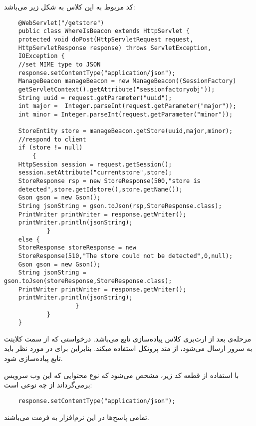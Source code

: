 \documentclass[oneside]{report}
\begin{document}
کد مربوط به این کلاس به شکل زیر می‌باشد: 
\begin{latin}
	\begin{verbatim}
	@WebServlet("/getstore")
	public class WhereIsBeacon extends HttpServlet {
	protected void doPost(HttpServletRequest request, 
	HttpServletResponse response) throws ServletException, 
	IOException {
	//set MIME type to JSON
	response.setContentType("application/json");
	ManageBeacon manageBeacon = new ManageBeacon((SessionFactory) 
	getServletContext().getAttribute("sessionfactoryobj"));
	String uuid = request.getParameter("uuid");
	int major =  Integer.parseInt(request.getParameter("major"));
	int minor = Integer.parseInt(request.getParameter("minor"));
	
	StoreEntity store = manageBeacon.getStore(uuid,major,minor);
	//respond to client
	if (store != null)
		{
	HttpSession session = request.getSession();
	session.setAttribute("currentstore",store);
	StoreResponse rsp = new StoreResponse(500,"store is 
	detected",store.getIdstore(),store.getName());
	Gson gson = new Gson();
	String jsonString = gson.toJson(rsp,StoreResponse.class);
	PrintWriter printWriter = response.getWriter();
	printWriter.println(jsonString);
	      	}
	else {
	StoreResponse storeResponse = new 
	StoreResponse(510,"The store could not be detected",0,null);
	Gson gson = new Gson();
	String jsonString = gson.toJson(storeResponse,StoreResponse.class);
	PrintWriter printWriter = response.getWriter();
	printWriter.println(jsonString);
	               	}
	        }
	}
	\end{verbatim}
\end{latin}
		
\noindent		
مرحله‌ی بعد از ارث‌بری کلاس
{\normalsize{}}
پیاده‌سازی تابع
{\normalsize{}}
می‌باشد. درخواستی که از سمت کلاینت به سرور ارسال می‌شود، از متد 
{\normalsize{}}
پروتکل 
{\normalsize{}}
استفاده میکند. بنابراین برای در 
{\normalsize{}}
مورد نظر باید تابع 
{\normalsize{}}
پیاده‌سازی شود. 

با استفاده از قطعه کد زیر، مشخص می‌شود که نوع محتوایی که این وب سرویس بر‌می‌گرداند از چه نوعی است:‌
\begin{latin}
\begin{verbatim}
	response.setContentType("application/json");
\end{verbatim}
	
\end{latin}
تمامی پاسخ‌ها در این نرم‌افزار به فرمت
{\normalsize{}}
می‌باشند. 
\end{document}
